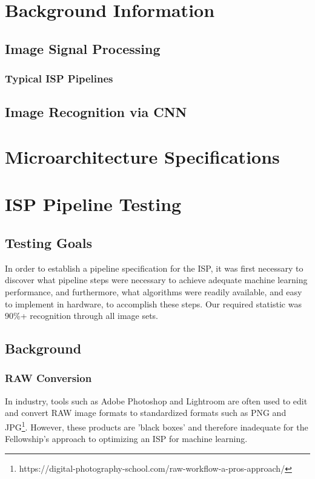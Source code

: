\documentclass{report}
\begin{document}
\chapter{Background Information}
	\section{Image Signal Processing}
		\subsection{Typical ISP Pipelines}
	\section{Image Recognition via CNN}
	
\chapter{Microarchitecture Specifications}

\chapter{ISP Pipeline Testing}
	\section{Testing Goals}
	In order to establish a pipeline specification for the ISP, it was first necessary to discover what pipeline steps were necessary to achieve adequate machine learning performance, and furthermore, what algorithms were readily available, and easy to implement in hardware, to accomplish these steps. Our required statistic was 90\%+ recognition through all image sets.
	\section{Background}
		\subsection{RAW Conversion}
		In industry, tools such as Adobe Photoshop and Lightroom are often used to edit and convert RAW image formats to standardized formats such as PNG and JPG\footnote{https://digital-photography-school.com/raw-workflow-a-pros-approach/}. However, these products are 'black boxes' and therefore inadequate for the Fellowship's approach to optimizing an ISP for machine learning.
		
\end{document}
